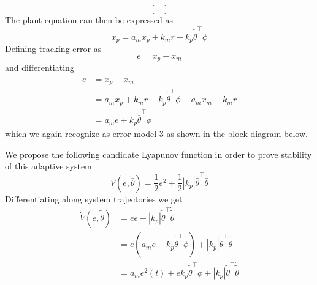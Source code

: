 \begin{example}
\begin{equation*}
\begin{bmatrix}
    \end{bmatrix}
  \end{equation*}
  The plant equation can then be expressed as
  \begin{equation*}
    \dot{x}_{p}=a_{m}x_{p}+k_{m}r+k_{p}\tilde{\bar{\theta}}^{\top}\phi
  \end{equation*}
  Defining tracking error as
  \begin{equation*}
    e=x_{p}-x_{m}
  \end{equation*}
  and differentiating
  \begin{align*}
    \dot{e}&=\dot{x}_{p}-\dot{x}_{m} \\
    &=a_{m}x_{p}+k_{m}r+k_{p}\tilde{\bar{\theta}}^{\top}\phi-a_{m}x_{m}-k_{m}r \\
    &=a_{m}e+k_{p}\tilde{\bar{\theta}}^{\top}\phi
  \end{align*}
  which we again recognize as error model 3 as shown in the block diagram below.
  \begin{center}
  \end{center}
  We propose the following candidate Lyapunov function in order to prove stability of this adaptive system
  \begin{equation*}
    V(e,\tilde{\bar{\theta}})=\frac{1}{2}e^{2}+\frac{1}{2}|k_{p}|\tilde{\bar{\theta}}^{\top}\tilde{\bar{\theta}}
  \end{equation*}
  Differentiating along system trajectories we get
  \begin{align*}
    \dot{V}(e,\tilde{\bar{\theta}})&=e\dot{e}+|k_{p}|\tilde{\bar{\theta}}^{\top}\dot{\tilde{\bar{\theta}}} \\
    &=e(a_{m}e+k_{p}\tilde{\bar{\theta}}^{\top}\phi)+|k_{p}|\tilde{\bar{\theta}}^{\top}\dot{\tilde{\bar{\theta}}} \\
    &=a_{m}e^{2}(t)+ek_{p}\tilde{\bar{\theta}}^{\top}\phi+|k_{p}|\tilde{\bar{\theta}}^{\top}\dot{\tilde{\bar{\theta}}}

\end{align*}
\end{example}
